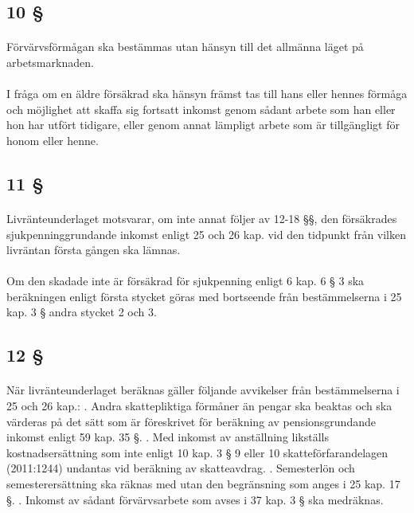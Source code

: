 \documentclass[a4paper,notitlepage,openany,10pt]{book}
\begin{document}
\subsection*{10 §}
\paragraph*{}
Förvärvsförmågan ska bestämmas utan hänsyn till det allmänna läget på arbetsmarknaden.
\paragraph*{}
I fråga om en äldre försäkrad ska hänsyn främst tas till hans eller hennes förmåga och möjlighet att skaffa sig fortsatt inkomst genom sådant arbete som han eller hon har utfört tidigare, eller genom annat lämpligt arbete som är tillgängligt för honom eller henne.
\subsection*{11 §}
\paragraph*{}
Livränteunderlaget motsvarar, om inte annat följer av 12-18 §§, den försäkrades sjukpenninggrundande inkomst enligt 25 och 26 kap. vid den tidpunkt från vilken livräntan första gången ska lämnas.
\paragraph*{}
Om den skadade inte är försäkrad för sjukpenning enligt 6 kap. 6 § 3 ska beräkningen enligt första stycket göras med bortseende från bestämmelserna i 25 kap. 3 § andra stycket 2 och 3.
\subsection*{12 §}
\paragraph*{}
När livränteunderlaget beräknas gäller följande avvikelser från bestämmelserna i 25 och 26 kap.:
. Andra skattepliktiga förmåner än pengar ska beaktas och ska värderas på det sätt som är föreskrivet för beräkning av pensionsgrundande inkomst enligt 59 kap. 35 §.
. Med inkomst av anställning likställs kostnadsersättning som inte enligt 10 kap. 3 § 9 eller 10 skatteförfarandelagen (2011:1244) undantas vid beräkning av skatteavdrag.
. Semesterlön och semesterersättning ska räknas med utan den begränsning som anges i 25 kap. 17 §.
. Inkomst av sådant förvärvsarbete som avses i 37 kap. 3 § ska medräknas.
\end{document}

